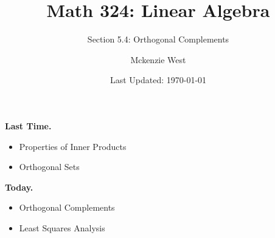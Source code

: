 \documentclass{beamer}
\theoremstyle{definition}
\begin{document}
	\title{Math 324: Linear Algebra}
	\subtitle{Section 5.4: Orthogonal Complements}
	\author{Mckenzie West}
	\date{Last Updated: \today}
\begin{frame}
\maketitle
\end{frame}

\begin{frame}{\insertframenumber}
	\begin{block}{\textbf{Last Time.}}
	\begin{itemize}[label=--]
		\item Properties of Inner Products
		\item Orthogonal Sets
	\end{itemize}
	\end{block}
	\begin{block}{\textbf{Today.}}
		\begin{itemize}[label=--]
			\item Orthogonal Complements
			\item Least Squares Analysis
		\end{itemize}
	\end{block}
\end{frame}
\end{document}
